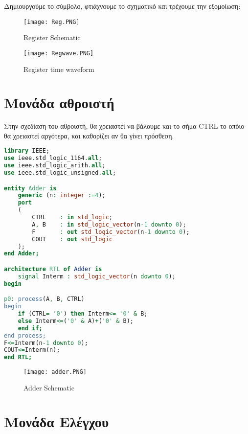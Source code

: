 \documentclass{article}
\begin{document}
Δημιουργούμε το σύμβολο, φτιάχνουμε το σχηματικό και τρέχουμε την εξομοίωση:

\begin{figure}[h!]
  \caption{\foreignlanguage{english}{Register Schematic}}
\texttt{[image: Reg.PNG]} 
\end{figure}

\begin{figure}[h!]
  \caption{\foreignlanguage{english}{Register time waveform}}
\texttt{[image: Regwave.PNG]}
\end{figure}

\clearpage


\section{Μονάδα αθροιστή}

Στην σχεδίαση του αθροιστή, θα χρειαστεί να βάλουμε και το σήμα \foreignlanguage{english}{CTRL} το οπόιο θα χρειαστεί αργότερα, και καθορίζει αν θα γίνει πρόσθεση.

\begin{otherlanguage}{english}
\begin{lstlisting}[language=VHDL, caption= Adder VHDL Code]
library IEEE;
use ieee.std_logic_1164.all;
use ieee.std_logic_arith.all;
use ieee.std_logic_unsigned.all;

entity Adder is
	generic (n: integer :=4);
	port
	(
		CTRL	: in std_logic;
		A, B	: in std_logic_vector(n-1 downto 0);
		F		: out std_logic_vector(n-1 downto 0);
		COUT	: out std_logic
	);
end Adder;

architecture RTL of Adder is
	signal Interm : std_logic_vector(n downto 0);
begin

p0: process(A, B, CTRL)
begin
	if (CTRL= '0') then Interm<= '0' & B;
	else Interm<=('0' & A)+('0' & B);
	end if;
end process;
F<=Interm(n-1 downto 0);
COUT<=Interm(n);
end RTL;
\end{lstlisting}
\end{otherlanguage}



\begin{figure}[h!]
  \caption{\foreignlanguage{english}{Adder Schematic}}
\texttt{[image: adder.PNG]} 
\end{figure}


\clearpage

\section{Μονάδα Ελέγχου}
\end{document}
